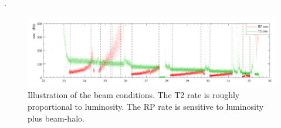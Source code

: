 .


\begin{figure}
\begin{center}
\includegraphics[width=16cm]{fig/overview.pdf}
\vskip-3mm
\caption{%
Illustration of the beam conditions. The T2 rate is roughly proportional to luminosity. The RP rate is sensitive to luminosity plus beam-halo.
}
\label{fig:overview}
\end{center}
\end{figure}
